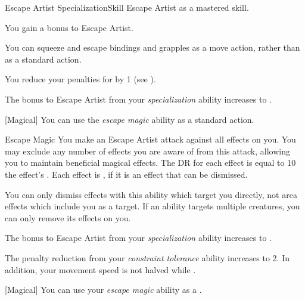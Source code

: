     \begin{feat}{Escape Artist Specialization}{Skill}
        \featpre Escape Artist as a mastered skill.

         You gain a  bonus to Escape Artist.

         You can squeeze and escape bindings and grapples as a move action, rather than as a standard action.

         You reduce your penalties for  by 1 (see ).

         The bonus to Escape Artist from your \textit{specialization} ability increases to .

        [Magical] You can use the \textit{escape magic} ability as a standard action.
        \begin{apability}{Escape Magic}
            You make an Escape Artist attack against all  effects on you.
            You may exclude any number of effects you are aware of from this attack, allowing you to maintain beneficial magical effects.
            The DR for each effect is equal to 10 \add the effect's .
            \hit Each effect is , if it is an effect that can be dismissed.
        \end{apability}

        You can only dismiss effects with this ability which target you directly, not area effects which include you as a target.
        If an ability targets multiple creatures, you can only remove its effects on you.

         The bonus to Escape Artist from your \textit{specialization} ability increases to .

         The penalty reduction from your \textit{constraint tolerance} ability increases to 2.
        In addition, your movement speed is not halved while .

        [Magical] You can use your \textit{escape magic} ability as a .
    \end{feat}

